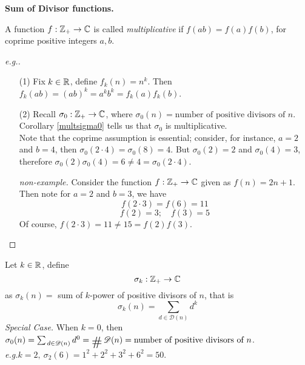 {\bf\large Sum of Divisor functions.}
\vspace*{0.5em}
\begin{definition}
A function $f:\mathbb Z_+ \to \mathbb C$ is called \emph{multiplicative} if $f(ab) = f(a)f(b)$, for coprime positive integers $a,b$.
\vspace{0.5em}\\
\begin{proof}[e.g.]\renewcommand{\qedsymbol}{}
\begin{itemize}
\item[(1)] Fix $k \in \mathbb R$, define $f_k(n) = n^k$. Then $f_k(ab) = (ab)^k = a^kb^k = f_k(a)f_k(b)$.
\end{itemize}
\begin{itemize}[leftmargin=4.4em]
\item[(2)] Recall $\sigma_0:\mathbb Z_+ \to \mathbb C$, where $\sigma_0(n) = \text{number of positive divisors of $n$}$. Corollary \ref{multsigma0} tells us that $\sigma_0$ is multiplicative.\\[0.5em]
Note that the coprime assumption is essential; consider, for instance, $a = 2$ and $b = 4$, then $\sigma_0(2\cdot 4) = \sigma_0(8) = 4$. But $\sigma_0(2) = 2$ and $\sigma_0(4) = 3$, therefore $\sigma_0(2)\sigma_0(4) = 6 \neq 4 = \sigma_0(2\cdot 4)$.
\end{itemize}
\begin{itemize}[leftmargin=6em]
\item[\emph{non-example.}] Consider the function $f: \mathbb Z_+ \to \mathbb C$ given as $f(n) = 2n+1$. Then note for $a = 2$ and $b = 3$, we have
\[f(2\cdot 3) = f(6) = 11\]
\[f(2) = 3;\quad f(3) = 5\]
Of course, $f(2\cdot 3) = 11 \neq 15 = f(2)f(3)$.
\end{itemize}
\end{proof} 
\end{definition}


\begin{definition}
Let $k \in \mathbb R$, define 
\[\sigma_k:\mathbb Z_+ \to \mathbb C\]
as $\sigma_k(n) =$ sum of $k$-power of positive divisors of $n$, that is
\[\sigma_k(n) = \sum_{d \in \mathscr{D}(n)}d^k\]
\emph{Special Case.} When $k = 0$, then $\sigma_0(n) = \sum_{\,d\in \mathscr{D}(n)}d^0 = \card\,\mathscr{D}(n) = \text{number of positive divisors of $n$}$.\\[1em]
\emph{e.g.}\quad $k = 2,\ \sigma_2(6) = 1^2 + 2^2 + 3^2 + 6^2 = 50$.
\end{definition}

